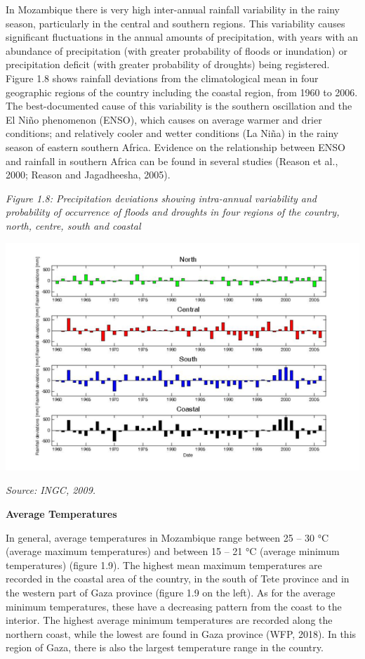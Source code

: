 \documentclass[
]{book}
\begin{document}
In Mozambique there is very high inter-annual rainfall variability in the rainy season, particularly in the central and southern regions. This variability causes significant fluctuations in the annual amounts of precipitation, with years with an abundance of precipitation (with greater probability of floods or inundation) or precipitation deficit (with greater probability of droughts) being registered. Figure 1.8 shows rainfall deviations from the climatological mean in four geographic regions of the country including the coastal region, from 1960 to 2006. The best-documented cause of this variability is the southern oscillation and the El Niño phenomenon (ENSO), which causes on average warmer and drier conditions; and relatively cooler and wetter conditions (La Niña) in the rainy season of eastern southern Africa. Evidence on the relationship between ENSO and rainfall in southern Africa can be found in several studies (Reason et al., 2000; Reason and Jagadheesha, 2005).

\emph{Figure 1.8: Precipitation deviations showing intra-annual variability and probability of occurrence of floods and droughts in four regions of the country, north, centre, south and coastal}

\includegraphics{Precipitation-variability.png}

\emph{Source: INGC, 2009.}

\textbf{Average Temperatures}

In general, average temperatures in Mozambique range between 25 -- 30 °C (average maximum temperatures) and between 15 -- 21 °C (average minimum temperatures) (figure 1.9). The highest mean maximum temperatures are recorded in the coastal area of the country, in the south of Tete province and in the western part of Gaza province (figure 1.9 on the left). As for the average minimum temperatures, these have a decreasing pattern from the coast to the interior. The highest average minimum temperatures are recorded along the northern coast, while the lowest are found in Gaza province (WFP, 2018). In this region of Gaza, there is also the largest temperature range in the country.
\end{document}
